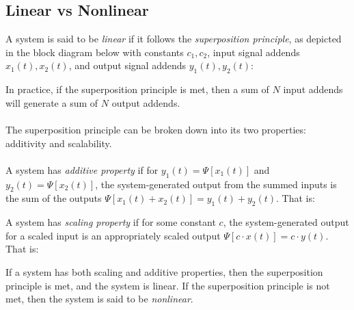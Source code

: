 \documentclass{report}
\begin{document}
\subsection{Linear vs Nonlinear}
A system is said to be \emph{linear} if it follows the \emph{superposition principle}, as depicted in the block diagram below with constants $c_1,c_2$, input signal 
addends $x_1(t), x_2(t)$, and output signal addends $y_1(t),y_2(t)$:
\begin{center}
\end{center}
In practice, if the superposition principle is met, then a sum of $N$ input addends will generate a sum of $N$ output addends. \\ \\
The superposition principle can be broken down into its two properties: additivity and scalability. 
\\ \\ 
A system has \emph{additive property} if for $y_1(t)=\Psi[x_1(t)]$ and $y_2(t)=\Psi[x_2(t)]$, the system-generated output from 
the summed inputs is the sum of the outputs $\Psi[x_1(t)+x_2(t)]=y_1(t)+y_2(t)$. That is:
\begin{center}
\end{center}
A system has \emph{scaling property} if for some constant $c$, the system-generated output for a scaled input is 
an appropriately scaled output $\Psi[c\cdot x(t)]=c\cdot y(t)$. That is:
\begin{center}
\end{center}
If a system has both scaling and additive properties, then the superposition principle is met, and the system is linear. If the superposition principle is not met, 
then the system is said to be \emph{nonlinear}.
\end{document}
